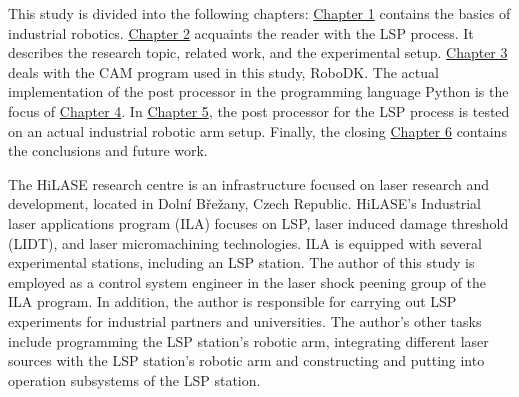 This study is divided into the following chapters: \hyperref[chap:basics]{Chapter 1} contains the basics of industrial robotics. \hyperref[chap:peening]{Chapter 2} acquaints the reader with the LSP process.  It describes the research topic, related work, and the experimental setup.  
\hyperref[chap:design]{Chapter 3} deals with the CAM program used in this study, RoboDK. The actual implementation of the post processor in the programming language Python is the focus of \hyperref[chap:implementation]{Chapter 4}. In \hyperref[chap:testing]{Chapter 5}, the post processor for the LSP process is tested on an actual industrial robotic arm setup. Finally, the closing \hyperref[chap:discussion]{Chapter 6} contains the conclusions and future work. 

The HiLASE research centre is an infrastructure focused on laser research and development, located in Dolní Břežany, Czech Republic. HiLASE's Industrial laser applications program (ILA) focuses on LSP, laser induced damage threshold (LIDT), and laser micromachining technologies. ILA is equipped with several experimental stations, including an LSP station. The author of this study is employed as a control system engineer in the laser shock peening group of the ILA program. In addition, the author is responsible for carrying out LSP experiments for industrial partners and universities. The author's other tasks include programming the LSP station's robotic arm, integrating different laser sources with the  LSP station's robotic arm and constructing and putting into operation subsystems of the LSP station. 